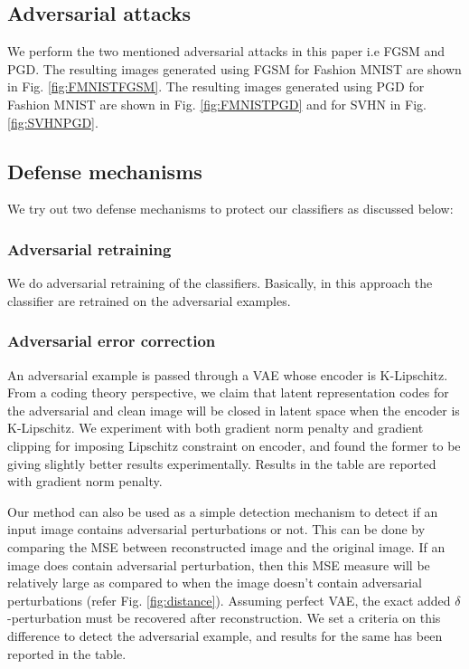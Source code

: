 \documentclass[journal]{IEEEtran}
\begin{document}
\subsection{Adversarial attacks}
We perform the two mentioned adversarial attacks in this paper i.e FGSM\cite{FGSM} and PGD\cite{PGD}. The resulting images generated using FGSM for Fashion MNIST are shown in Fig. \ref{fig:FMNISTFGSM}. The resulting images generated using PGD for Fashion MNIST are shown in Fig. \ref{fig:FMNISTPGD} and for SVHN in Fig. \ref{fig:SVHNPGD}.

\subsection{Defense mechanisms}
We try out two defense mechanisms to protect our classifiers as discussed below:

\subsubsection{Adversarial retraining}
We do adversarial retraining of the classifiers. Basically, in this approach the classifier are retrained on the adversarial examples.

\subsubsection{Adversarial error correction}
An adversarial example is passed through a VAE whose encoder is K-Lipschitz. From a coding theory perspective, we claim that latent representation codes for the adversarial and clean image will be closed in latent space when the encoder is K-Lipschitz. We experiment with both gradient norm penalty and gradient clipping for imposing Lipschitz constraint on encoder, and found the former to be giving slightly better results experimentally. Results in the table are reported with gradient norm penalty.

Our method can also be used as a simple detection mechanism to detect if an input image contains adversarial perturbations or not. This can be done by comparing the MSE between reconstructed image and the original image. If an image does contain adversarial perturbation, then this MSE measure will be relatively large as compared to when the image doesn’t contain adversarial perturbations (refer Fig. \ref{fig:distance}). Assuming perfect VAE, the exact added $\delta$-perturbation must be recovered after reconstruction. We set a criteria on this difference to detect the adversarial example, and results for the same has been reported in the table.
\end{document}
